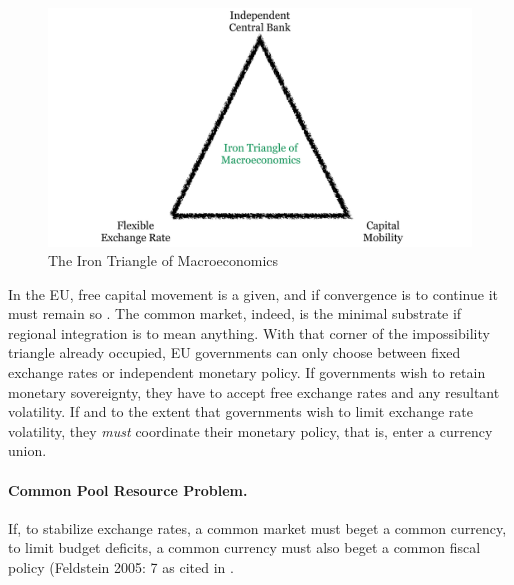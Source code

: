 \documentclass[11pt,a4paper,oneside,openright]{article}
\begin{document}
 \begin{figure}[htbp]
	\centering
	\includegraphics[width=1\linewidth]{./img/triangle-macro}  
	\caption{The Iron Triangle of Macroeconomics}
	\label{fig:triangle-macro}
\end{figure} 

In the \gls{EU}, free capital movement is a given, and if convergence is to continue it must remain so \citep{Abiad2007}. 
The common market, indeed, is the minimal substrate if regional integration is to mean anything. 
With that corner of the impossibility triangle already occupied, \gls{EU} governments can only choose between fixed exchange rates or independent monetary policy. 
If governments wish to retain monetary sovereignty, they have to accept free exchange rates and any resultant volatility. 
If and to the extent that governments wish to limit exchange rate volatility, they \emph{must} coordinate their monetary policy, that is, enter a currency union.

\paragraph[Fiscal-CPR]{Common Pool Resource Problem.}  \label{sec:Fiscal-CPR} If, to stabilize exchange rates, a common market must beget a common currency, to limit budget deficits, a common currency must also beget a common fiscal policy (Feldstein 2005: 7 as cited in \citep[13]{Begg2008}. 
\end{document}
